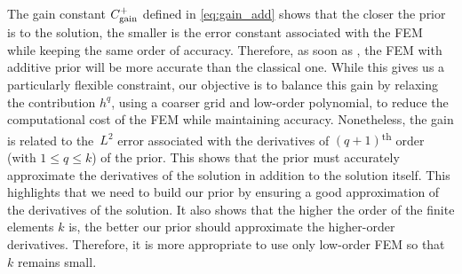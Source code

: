 \begin{remark}
    \label{rmk:C_gain_additif}
    The gain constant $C_\text{\rm gain}^+$ defined in \eqref{eq:gain_add} shows that the closer the prior is to the solution,
    the smaller is the error constant associated with the FEM while keeping the same order of accuracy.
    Therefore, as soon as , the FEM with additive prior will be more accurate than the classical one.
    While this gives us a particularly flexible constraint, our objective is to balance this gain by relaxing the contribution $h^q$, using a coarser grid and low-order polynomial, to reduce the computational cost of the FEM while maintaining accuracy.
    Nonetheless, the gain is related to the~$L^2$ error associated with the derivatives of $(q+1)$\textsuperscript{th} order (with $1\leqslant q\leqslant k$) of the prior.
    This shows that the prior must accurately approximate the derivatives of the solution in addition to the solution itself.
    This highlights that we need to build our prior by ensuring a good approximation of the derivatives of the solution.
    It also shows that the higher the order of the finite elements $k$ is, the better our prior should approximate the higher-order derivatives.
    Therefore, it is more appropriate to use only low-order FEM so that $k$ remains small.
\end{remark}
